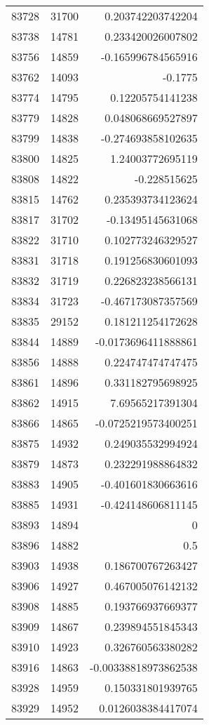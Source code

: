 \begin{tabular}{r | r | r}
83728 & 31700 & 0.203742203742204 \\
83738 & 14781 & 0.233420026007802 \\
83756 & 14859 & -0.165996784565916 \\
83762 & 14093 & -0.1775 \\
83774 & 14795 & 0.12205754141238 \\
83779 & 14828 & 0.048068669527897 \\
83799 & 14838 & -0.274693858102635 \\
83800 & 14825 & 1.24003772695119 \\
83808 & 14822 & -0.228515625 \\
83815 & 14762 & 0.235393734123624 \\
83817 & 31702 & -0.13495145631068 \\
83822 & 31710 & 0.102773246329527 \\
83831 & 31718 & 0.191256830601093 \\
83832 & 31719 & 0.226823238566131 \\
83834 & 31723 & -0.467173087357569 \\
83835 & 29152 & 0.181211254172628 \\
83844 & 14889 & -0.0173696411888861 \\
83856 & 14888 & 0.224747474747475 \\
83861 & 14896 & 0.331182795698925 \\
83862 & 14915 & 7.69565217391304 \\
83866 & 14865 & -0.0725219573400251 \\
83875 & 14932 & 0.249035532994924 \\
83879 & 14873 & 0.232291988864832 \\
83883 & 14905 & -0.401601830663616 \\
83885 & 14931 & -0.424148606811145 \\
83893 & 14894 & 0 \\
83896 & 14882 & 0.5 \\
83903 & 14938 & 0.186700767263427 \\
83906 & 14927 & 0.467005076142132 \\
83908 & 14885 & 0.193766937669377 \\
83909 & 14867 & 0.239894551845343 \\
83910 & 14923 & 0.326760563380282 \\
83916 & 14863 & -0.00338818973862538 \\
83928 & 14959 & 0.150331801939765 \\
83929 & 14952 & 0.0126038384417074 \\

\end{tabular}
